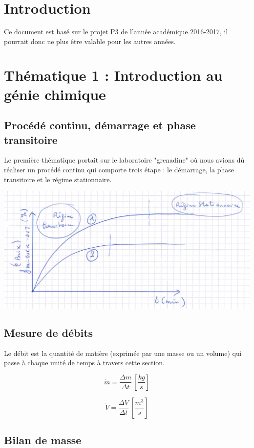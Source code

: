 \documentclass[fr]{../../../eplsummary}
\begin{document}
\section{Introduction}
\par Ce document est basé sur le projet P3 de l'année académique 2016-2017, il pourrait donc ne plus être valable pour les autres années.

\section{Thématique 1 : Introduction au génie chimique}

\subsection{Procédé continu, démarrage et phase transitoire}

\par Le première thématique portait sur le laboratoire "grenadine" où nous avions dû réaliser un procédé continu qui comporte trois étape : le démarrage, la phase transitoire et le régime stationnaire.
\begin{center}
\includegraphics[scale = 0.3]{gren.png}
\end{center}

\subsection{Mesure de débits}
\par Le débit est la quantité de matière (exprimée par une masse ou un volume) qui passe à chaque unité de temps à travers cette section.

$$\dot{m} = \frac{\Delta m}{\Delta t} \,  [\frac{kg}{s}]$$

$$\dot{V} = \frac{\Delta V}{\Delta t} \,  [\frac{m^{3}}{s}]$$

\subsection{Bilan de masse}
\end{document}
